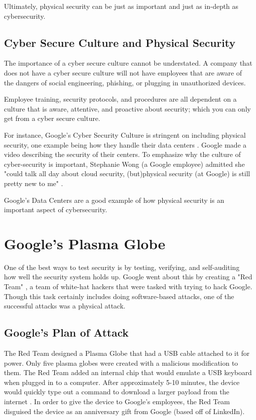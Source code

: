 \documentclass[acmsmall]{acmart}
\begin{document}
Ultimately, physical security can be just as important and just as in-depth
as cybersecurity.

\subsection{Cyber Secure Culture and Physical Security}
The importance of a cyber secure culture cannot be understated. A company
that does not have a cyber secure culture will not have employees that
are aware of the dangers of social engineering, phishing, or plugging in
unauthorized devices.

Employee training, security protocols, and procedures are all dependent
on a culture that is aware, attentive, and proactive about security;
which you can only get from a cyber secure culture.

For instance, Google's Cyber Security Culture is stringent on including
physical security, one example being how they handle their data centers \cite{GoogleData}.
Google made a video describing the security of their centers. To emphasize why
the culture of cyber-security is important,
Stephanie Wong (a Google employee) admitted she "could talk all day
about cloud security, (but)physical security (at Google) is still pretty new to me" \cite{GoogleDataVideo}.

Google's Data Centers are a good example of how physical security is an important
aspect of cybersecurity.

\section{Google's Plasma Globe}
One of the best ways to test security is by testing, verifying, and self-auditing
how well the security system holds up. Google went about this by creating a
"Red Team" \cite{GoogleRedTeamBlog}, a team of white-hat hackers that were tasked with trying to hack Google.
Though this task certainly includes doing software-based attacks, one of the successful
attacks was a physical attack.

\subsection{Google's Plan of Attack}
The Red Team designed a Plasma Globe that had a USB cable attached to it for power.
Only five plasma globes were created with a malicious modification to them.
The Red Team added an internal chip that would emulate a USB keyboard when plugged
in to a computer. After approximately 5-10 minutes, the device would
quickly type out a command to download a larger payload from the internet \cite{GoogleGlobeBlog}.
In order to give the device to Google's employees, the Red Team disguised the
device as an anniversary gift from Google (based off of LinkedIn).
\end{document}
